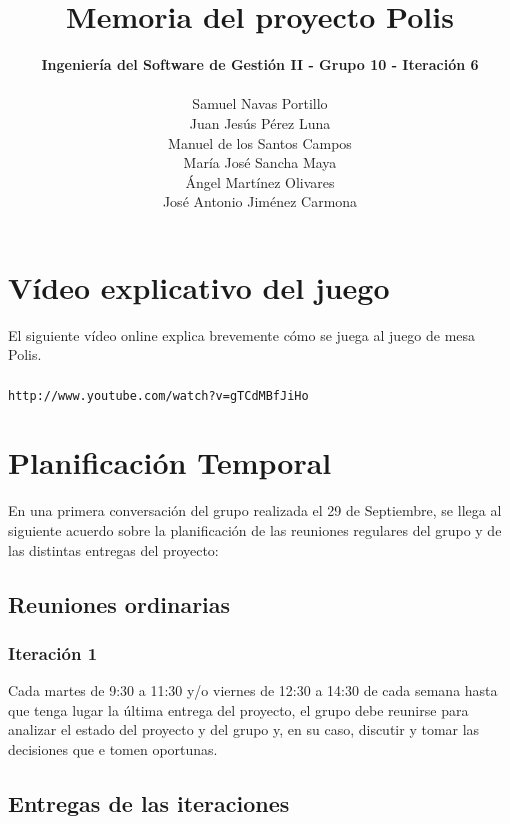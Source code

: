 \documentclass[11 pt]{book}
\begin{document}
\title{\textbf {\Huge Memoria del proyecto Polis}}
\author{
	\textbf {Ingeniería del Software de Gestión II - Grupo 10 - Iteración 6}\\\\
	Samuel Navas Portillo\\
	Juan Jesús Pérez Luna\\
	Manuel de los Santos Campos\\
	María José Sancha Maya\\
	Ángel Martínez Olivares\\
	José Antonio Jiménez Carmona}
\maketitle
\tableofcontents{}

\chapter{Vídeo explicativo del juego}
	El siguiente vídeo online explica brevemente cómo se juega al juego de mesa Polis.\\ \\
	\texttt{http://www.youtube.com/watch?v=gTCdMBfJiHo}
	
\chapter{Planificación Temporal}
	En una primera conversación del grupo realizada el 29 de Septiembre, se llega al siguiente acuerdo sobre la planificación de las reuniones regulares del grupo y de las distintas entregas del proyecto:\\

    \section{Reuniones ordinarias}
        \subsection*{Iteración 1}
	        Cada martes de 9:30 a 11:30 y/o viernes de 12:30 a 14:30 de cada semana hasta que tenga lugar la última entrega del proyecto, el grupo debe reunirse para analizar el estado del proyecto y del grupo y, en su caso, discutir y tomar las decisiones que e tomen oportunas.\\

    \section{Entregas de las iteraciones}
\end{document}
